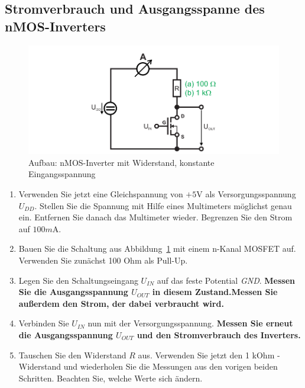 \documentclass[10pt]{scrreprt}
\begin{document}
    \subsection{Stromverbrauch und Ausgangsspanne des nMOS-Inverters}
    \begin{figure}[H]
        \includegraphics[width=\textwidth]{abb13.png}
        \caption{Aufbau: nMOS-Inverter mit Widerstand, konstante Eingangsspannung}
        \label{fig:abb13}
    \end{figure}

    \begin{enumerate}
        \item Verwenden Sie jetzt eine Gleichspannung von $+5\si{\volt}$ als Versorgungsspannung $U_{DD}$.
            Stellen Sie die Spannung mit Hilfe eines Multimeters möglichst genau ein. Entfernen
            Sie danach das Multimeter wieder. Begrenzen Sie den Strom auf $100\si{m\ampere}$.
        \item Bauen Sie die Schaltung aus Abbildung~\ref{fig:abb13} mit einem n-Kanal MOSFET auf.
            Verwenden Sie zunächst 100 Ohm als Pull-Up.
        \item Legen Sie den Schaltungseingang $U_{IN}$ auf das feste Potential \textit{GND}.
            \textbf{Messen Sie  die Ausgangsspannung $U_{OUT}$ in diesem Zustand.Messen Sie außerdem
            den Strom, der dabei verbraucht wird.}
        \item Verbinden Sie $U_{IN}$ nun mit der Versorgungsspannung. \textbf{Messen Sie erneut die
            Ausgangsspannung $U_{OUT}$ und den Stromverbrauch des Inverters.}
        \item Tauschen Sie den Widerstand $R$ aus. Verwenden Sie jetzt den 1 kOhm - Widerstand
            und wiederholen Sie die Messungen aus den vorigen beiden Schritten.
            Beachten Sie, welche Werte sich ändern.
    \end{enumerate}
\end{document}

